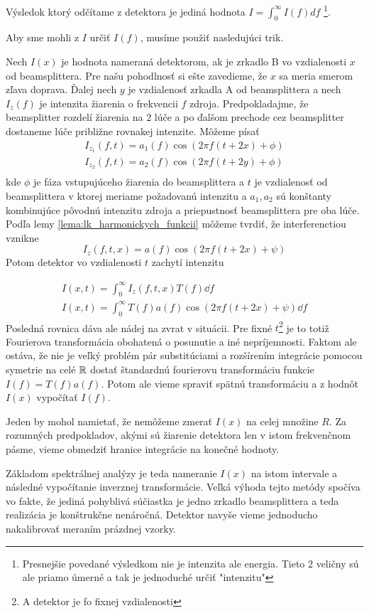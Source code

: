 Výsledok ktorý odčítame z detektora je jediná hodnota 
$I=\int_0^\infty I(f) df$
\footnote{Presnejšie povedané výsledkom nie je intenzita ale energia.
Tieto 2 veličny sú ale priamo úmerné a tak je jednoduché určiť
"intenzitu"}.

Aby sme mohli z $I$ určiť $I(f)$, musíme použiť nasledujúci trik.

Nech $I(x)$ je hodnota nameraná detektorom, ak je zrkadlo B vo
vzdialenosti $x$ od beamsplittera. Pre našu pohodlnosť si ešte zavedieme,
že $x$ sa meria smerom zľava doprava. Ďalej nech $y$ je vzdialenosť zrkadla
A od beamsplittera a nech $I_z(f)$ je intenzita žiarenia o frekvencii
$f$ zdroja. Predpokladajme, že beamsplitter rozdelí žiarenia na 2 lúče
a po ďalšom prechode cez beamsplitter dostaneme lúče 
približne rovnakej intenzite. Môžeme písať
\begin{align}
    I_{z_1}(f,t) = a_1(f) \cos (2 \pi f (t+2x) + \phi) \\
    I_{z_2}(f,t) = a_2(f) \cos (2 \pi f (t+2y) + \phi) \\
\end{align}
kde $\phi$ je fáza vstupujúceho žiarenia do beamsplittera a $t$ je
vzdialenosť od beamsplittera v ktorej meriame požadovanú intenzitu a
$a_1,a_2$ sú konštanty kombinujúce pôvodnú intenzitu zdroja a
priepustnosť beamsplittera pre oba lúče.
Podľa lemy \ref{lema:lk_harmonickych_funkcii} môžeme tvrdiť, že
interferenctiou vznikne
\begin{equation}
    I_{z}(f,t,x) = a(f) \cos (2 \pi f (t+2x) + \psi)
\end{equation}
Potom detektor vo vzdialenosti $t$ zachytí intenzitu

\begin{align}
    I(x,t)=\int_0^\infty I_z(f,t,x) T(f) \dd f \\
    I(x,t)=\int_0^\infty T(f) a(f) \cos(2 \pi f (t + 2x) + \psi) \dd f
\end{align}
Posledná rovnica dáva ale nádej na zvrat v situácii. Pre fixné
$t$\footnote{A detektor je fo fixnej vzdialenosti} 
je to totiž Fourierova transformácia obohatená o posunutie a iné
nepríjemnosti. Faktom ale ostáva, že nie je veľký problém pár
substitúciami a rozšírením integrácie pomocou symetrie na celé ${\mathbb R}$
dostať štandardnú fourierovu transformáciu funkcie $I(f) = T(f) a(f)$.
Potom ale vieme spraviť spätnú transformáciu a z hodnôt $I(x)$
vypočítať $I(f)$.
\begin{poznamka}
    Jeden by mohol namietať, že nemôžeme zmerať
    $I(x)$ na celej množine $R$. Za rozumných predpokladov, akými sú
    žiarenie detektora len v istom frekvenčnom pásme,
    vieme obmedziť hranice integrácie na konečné hodnoty.
\end{poznamka}

Základom spektrálnej analýzy je teda nameranie $I(x)$ na istom
intervale a následné vypočítanie inverznej transformácie. Veľká výhoda
tejto metódy spočíva vo fakte, že jediná pohyblivá súčiastka je jedno
zrkadlo beamsplittera a teda realizácia je konštrukčne nenáročná.
Detektor navyše vieme jednoducho nakalibrovať meraním prázdnej vzorky.
